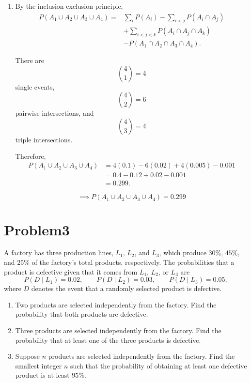 \documentclass[12pt]{article}
\begin{document}
\begin{enumerate}
    \item[(b)]
    By the inclusion-exclusion principle,
    \[
    \begin{aligned}
    P(A_1\cup A_2\cup A_3\cup A_4)
    ={}&
    \sum_i P(A_i)
    -
    \sum_{i<j}P(A_i\cap A_j)\\
    &+
    \sum_{i<j<k}P(A_i\cap A_j\cap A_k)\\
    &-
    P(A_1\cap A_2\cap A_3\cap A_4).
    \end{aligned}
    \]

    There are
    \[
    \binom{4}{1}=4
    \]
    single events,
    \[
    \binom{4}{2}=6
    \]
    pairwise intersections, and
    \[
    \binom{4}{3}=4
    \]
    triple intersections.

    Therefore,
    \[
    \begin{aligned}
    P(A_1\cup A_2\cup A_3\cup A_4)
    &=
    4(0.1)-6(0.02)+4(0.005)-0.001\\
    &=
    0.4-0.12+0.02-0.001\\
    &=
    0.299.
    \end{aligned}
    \]

    \[
    \implies
    P(A_1\cup A_2\cup A_3\cup A_4)=0.299
    \]

\end{enumerate}


\section*{Problem3}

A factory has three production lines, $L_1$, $L_2$, and $L_3$, which produce
$30\%$, $45\%$, and $25\%$ of the factory's total products, respectively.
The probabilities that a product is defective given that it comes from
$L_1$, $L_2$, or $L_3$ are
\[
P(D\mid L_1)=0.02,\qquad
P(D\mid L_2)=0.03,\qquad
P(D\mid L_3)=0.05,
\]
where $D$ denotes the event that a randomly selected product is defective.

\begin{enumerate}
    \item[(a)] Two products are selected independently from the factory.
    Find the probability that both products are defective.

    \item[(b)] Three products are selected independently from the factory.
    Find the probability that at least one of the three products is defective.

    \item[(c)] Suppose $n$ products are selected independently from the factory.
    Find the smallest integer $n$ such that the probability of obtaining
    at least one defective product is at least $95\%$.
\end{enumerate}
\end{document}
